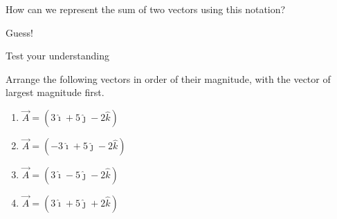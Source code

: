 \documentclass[]{beamer}
\begin{document}
\begin{frame}

How can we represent the sum of two vectors using this notation?

\vspace{3mm}

Guess! 


 \end{frame}


\begin{frame}

Test your understanding


\vspace{3mm}


Arrange the following vectors
in order of their magnitude, with the vector of largest magnitude first.
\vspace{3mm}

\begin{enumerate}
\item $\vec{A}=(3\hat{\imath}+5\hat{\jmath}-2\hat{k})$
\item $\vec{A}=(-3\hat{\imath}+5\hat{\jmath}-2\hat{k})$
\item $\vec{A}=(3\hat{\imath}-5\hat{\jmath}-2\hat{k})$
\item $\vec{A}=(3\hat{\imath}+5\hat{\jmath}+2\hat{k})$
\end{enumerate}

 


 \end{frame}

\end{document}
